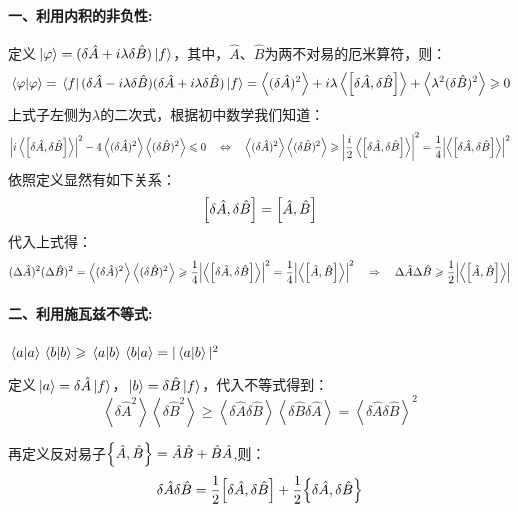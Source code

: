 \paragraph*{一、利用内积的非负性:}

定义$\ket*{\varphi}=(\delta\hat{A}+i\lambda \delta\hat{B})\ket*{f}$，其中，$\hat{A}$、$\hat{B}$为两不对易的厄米算符，则：
\[\bra*{\varphi}\ket*{\varphi}=\bra*{f}(\delta\hat{A}-i\lambda \delta\hat{B})(\delta\hat{A}+i\lambda \delta\hat{B})\ket*{f} = \left \langle (\delta\hat{A})^2 \right \rangle+i\lambda\left \langle \comm{\delta\hat{A}}{\delta\hat{B}} \right \rangle+\left \langle \lambda^2(\delta\hat{B})^2 \right \rangle \geqslant 0\]
上式子左侧为$\lambda$的二次式，根据初中数学我们知道：
\[\left |i\left \langle \comm{\delta\hat{A}}{\delta\hat{B}} \right \rangle\right |^2-4\left \langle (\delta\hat{A})^2 \right \rangle\left \langle (\delta\hat{B})^2 \right \rangle \leqslant 0 \quad \Leftrightarrow \quad \left \langle (\delta\hat{A})^2 \right \rangle\left \langle (\delta\hat{B})^2 \right \rangle \geqslant \qty|\frac{i}{2}\left \langle \comm{\delta\hat{A}}{\delta\hat{B}} \right \rangle|^2=\frac{1}{4}\qty|\left \langle \comm{\delta\hat{A}}{\delta\hat{B}} \right \rangle|^2\]
依照定义显然有如下关系：
\[\comm{\delta\hat{A}}{\delta\hat{B}}=\comm{\hat{A}}{\hat{B}}\]
代入上式得：
\[(\Delta \hat{A})^2(\Delta \hat{B})^2 = \left \langle (\delta\hat{A})^2 \right \rangle\left \langle (\delta\hat{B})^2 \right \rangle \geqslant \frac{1}{4}\qty|\left \langle \comm{\delta\hat{A}}{\delta\hat{B}} \right \rangle|^2=\frac{1}{4}\qty|\left \langle \comm{\hat{A}}{\hat{B}} \right \rangle|^2 \quad \Rightarrow \quad \Delta \hat{A}\Delta \hat{B} \geqslant \frac{1}{2}\qty|\left \langle \comm{\hat{A}}{\hat{B}} \right \rangle|\]

\paragraph*{二、利用施瓦兹不等式:}$\bra*{a}\ket*{a}\bra*{b}\ket*{b} \geqslant \bra*{a}\ket*{b}\bra*{b}\ket*{a}=|\bra*{a}\ket*{b}|^2$

定义$\ket*{a}=\delta\hat{A}\ket*{f}$，$\ket*{b}=\delta\hat{B}\ket*{f}$，代入不等式得到：
\[\left \langle \delta\hat{A}^2 \right \rangle\left \langle \delta\hat{B}^2 \right \rangle \geqslant \left \langle \delta\hat{A}\delta\hat{B} \right \rangle\left \langle \delta\hat{B}\delta\hat{A} \right \rangle=\left \langle \delta\hat{A}\delta\hat{B} \right \rangle^2\]

再定义反对易子$\qty{\hat{A},\hat{B}}=\hat{A}\hat{B}+\hat{B}\hat{A}$,则：
\[\delta\hat{A}\delta\hat{B}=\frac{1}{2}\comm{\delta\hat{A}}{\delta\hat{B}}+\frac{1}{2}\qty{\delta\hat{A},\delta\hat{B}}\]

